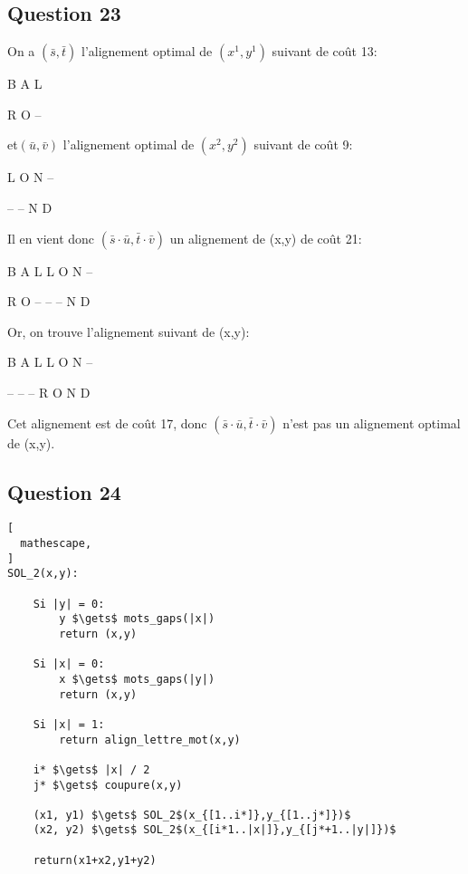 \documentclass{report}
\begin{document}
\subsection*{Question 23}
On a $(\bar{s},\bar{t})$ l'alignement optimal de $(x^{1},y^{1})$ suivant  de coût 13:
\begin{center}
B A L
 
R O --
\end{center}

et$(\bar{u},\bar{v})$ l'alignement optimal de $(x^{2},y^{2})$ suivant  de coût 9:
\begin{center}
L O N --
 
-- -- N D
\end{center}

Il en vient donc $(\bar{s}\cdot\bar{u},\bar{t}\cdot\bar{v})$ un alignement de (x,y) de coût 21:
\begin{center}
B A L L O N --
 
R O -- -- -- N D
\end{center}

Or, on trouve l'alignement suivant de (x,y):
\begin{center}
B A L L O N --

-- -- -- R O N D
\end{center}

Cet alignement est de coût 17, donc $(\bar{s}\cdot\bar{u},\bar{t}\cdot\bar{v})$ n'est pas un alignement optimal de (x,y).

\clearpage

\subsection*{Question 24}
\begin{lstlisting}[
  mathescape,
]
SOL_2(x,y):

    Si |y| = 0:
        y $\gets$ mots_gaps(|x|)
        return (x,y)
        
    Si |x| = 0:
        x $\gets$ mots_gaps(|y|)
        return (x,y)
        
    Si |x| = 1:
        return align_lettre_mot(x,y)
        
    i* $\gets$ |x| / 2
    j* $\gets$ coupure(x,y)
    
    (x1, y1) $\gets$ SOL_2$(x_{[1..i*]},y_{[1..j*]})$
    (x2, y2) $\gets$ SOL_2$(x_{[i*1..|x|]},y_{[j*+1..|y|]})$
    
    return(x1+x2,y1+y2)
        
\end{lstlisting}
\end{document}
